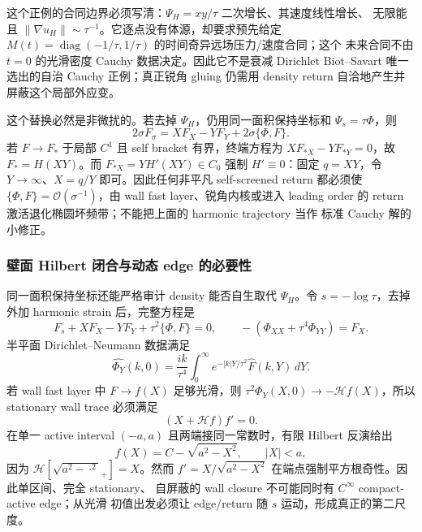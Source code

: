 \documentclass[11pt,a4paper,fontset=fandol]{ctexart}
\newcommand{\norm}[1]{\left\lVert #1\right\rVert}
\newcommand{\Order}{\mathcal O}
\begin{document}
这个正例的合同边界必须写清：$\Psi_H=xy/\tau$ 二次增长、其速度线性增长、
无限能且
$\norm{\nabla u_H}\sim\tau^{-1}$。它逐点没有体源，却要求预先给定
$M(t)=\operatorname{diag}(-1/\tau,1/\tau)$ 的时间奇异远场压力/速度合同；这个
未来合同不由 $t=0$ 的光滑密度 Cauchy 数据决定。因此它不是衰减 Dirichlet
Biot--Savart 唯一选出的自治 Cauchy 正例；真正锐角 gluing 仍需用 density
return 自洽地产生并屏蔽这个局部外应变。

这个替换必然是非微扰的。若去掉 $\Psi_H$，仍用同一面积保持坐标和
$\Psi_s=\tau\Phi$，则
\begin{equation}
  2\sigma F_\sigma
  =XF_X-YF_Y+2\sigma\{\Phi,F\}.
  \label{eq:self-screened-affine}
\end{equation}
若 $F\to F_*$ 于局部 $C^1$ 且 self bracket 有界，终端方程为
$XF_{*X}-YF_{*Y}=0$，故 $F_*=H(XY)$。而
$F_{*X}=YH'(XY)\in C_0$ 强制 $H'\equiv0$：固定 $q=XY$，令
$Y\to\infty$、$X=q/Y$ 即可。因此任何非平凡 self-screened return 都必须使
$\{\Phi,F\}=\Order(\sigma^{-1})$，由 wall fast layer、锐角内核或进入 leading
order 的 return 激活退化椭圆坏频带；不能把上面的 harmonic trajectory 当作
标准 Cauchy 解的小修正。

\subsubsection{壁面 Hilbert 闭合与动态 edge 的必要性}

同一面积保持坐标还能严格审计 density 能否自生取代 $\Psi_H$。令
$s=-\log\tau$，去掉外加 harmonic strain 后，完整方程是
\begin{equation}
 F_s+XF_X-YF_Y+\tau^2\{\Phi,F\}=0,
 \qquad
 -(\Phi_{XX}+\tau^4\Phi_{YY})=F_X.
 \label{eq:wall-hilbert-system}
\end{equation}
半平面 Dirichlet--Neumann 数据满足
\begin{equation}
 \widehat{\Phi_Y}(k,0)=\frac{ik}{\tau^4}
 \int_0^\infty e^{-|k|Y/\tau^2}\widehat F(k,Y)\,dY.
 \label{eq:wall-hilbert-neumann}
\end{equation}
若 wall fast layer 中 $F\to f(X)$ 足够光滑，则
$\tau^2\Phi_Y(X,0)\to-\mathcal Hf(X)$，所以 stationary wall trace 必须满足
\begin{equation}
 \boxed{(X+\mathcal Hf)f'=0.}
 \label{eq:wall-hilbert-closure}
\end{equation}
在单一 active interval $(-a,a)$ 且两端接同一常数时，有限 Hilbert 反演给出
\begin{equation}
 f(X)=C-\sqrt{a^2-X^2},\qquad |X|<a,
 \label{eq:wall-hilbert-root}
\end{equation}
因为 $\mathcal H[\sqrt{a^2-\cdot^2}_+]=X$。然而
$f'=X/\sqrt{a^2-X^2}$ 在端点强制平方根奇性。因此单区间、完全 stationary、
自屏蔽的 wall closure 不可能同时有 $C^\infty$ compact-active edge；从光滑
初值出发必须让 edge/return 随 $s$ 运动，形成真正的第二尺度。
\end{document}
